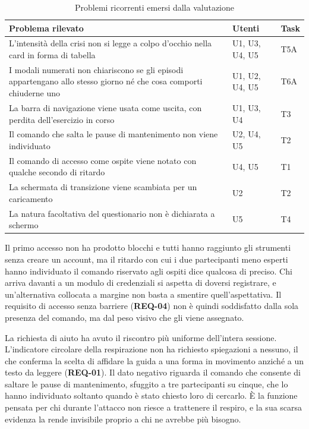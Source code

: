 \begin{table}[htbp]
    \centering
    \small
    \renewcommand{\arraystretch}{1.3}
    \begin{tabularx}{\textwidth}{X L{2.9cm} L{1.4cm}}
        \toprule
        \textbf{Problema rilevato} & \textbf{Utenti} & \textbf{Task} \\
        \midrule
        L'intensità della crisi non si legge a colpo d'occhio nella card in forma di tabella & U1, U3, U4, U5 & T5A \\
        I modali numerati non chiariscono se gli episodi appartengano allo stesso giorno né che cosa comporti chiuderne uno & U1, U2, U4, U5 & T6A \\
        La barra di navigazione viene usata come uscita, con perdita dell'esercizio in corso & U1, U3, U4 & T3 \\
        Il comando che salta le pause di mantenimento non viene individuato & U2, U4, U5 & T2 \\
        Il comando di accesso come ospite viene notato con qualche secondo di ritardo & U4, U5 & T1 \\
        La schermata di transizione viene scambiata per un caricamento & U2 & T2 \\
        La natura facoltativa del questionario non è dichiarata a schermo & U5 & T4 \\
        \bottomrule
    \end{tabularx}
    \caption{Problemi ricorrenti emersi dalla valutazione}
    \label{tab:problemi}
\end{table}

Il primo accesso non ha prodotto blocchi e tutti hanno raggiunto gli strumenti senza creare un account, ma il ritardo con cui i due partecipanti meno esperti hanno individuato il comando riservato agli ospiti dice qualcosa di preciso.
Chi arriva davanti a un modulo di credenziali si aspetta di doversi registrare, e un'alternativa collocata a margine non basta a smentire quell'aspettativa.
Il requisito di accesso senza barriere (\textbf{REQ-04}) non è quindi soddisfatto dalla sola presenza del comando, ma dal peso visivo che gli viene assegnato.

La richiesta di aiuto ha avuto il riscontro più uniforme dell'intera sessione.
L'indicatore circolare della respirazione non ha richiesto spiegazioni a nessuno, il che conferma la scelta di affidare la guida a una forma in movimento anziché a un testo da leggere (\textbf{REQ-01}).
Il dato negativo riguarda il comando che consente di saltare le pause di mantenimento, sfuggito a tre partecipanti su cinque, che lo hanno individuato soltanto quando è stato chiesto loro di cercarlo.
È la funzione pensata per chi durante l'attacco non riesce a trattenere il respiro, e la sua scarsa evidenza la rende invisibile proprio a chi ne avrebbe più bisogno.

